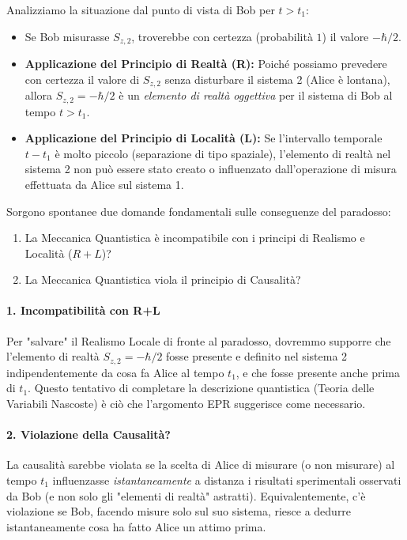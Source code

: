 Analizziamo la situazione dal punto di vista di Bob per $t > t_1$:
\begin{itemize}
    \item Se Bob misurasse $S_{z,2}$, troverebbe con certezza (probabilità $1$) il valore $-\hbar/2$.
    \item \textbf{Applicazione del Principio di Realtà (R):} Poiché possiamo prevedere con certezza il valore di $S_{z,2}$ senza disturbare il sistema 2 (Alice è lontana), allora $S_{z,2} = -\hbar/2$ è un \textit{elemento di realtà oggettiva} per il sistema di Bob al tempo $t > t_1$.
    \item \textbf{Applicazione del Principio di Località (L):} Se l'intervallo temporale $t - t_1$ è molto piccolo (separazione di tipo spaziale), l'elemento di realtà nel sistema 2 non può essere stato creato o influenzato dall'operazione di misura effettuata da Alice sul sistema 1.
\end{itemize}

Sorgono spontanee due domande fondamentali sulle conseguenze del paradosso:
\begin{enumerate}
    \item La Meccanica Quantistica è incompatibile con i principi di Realismo e Località ($R+L$)?
    \item La Meccanica Quantistica viola il principio di Causalità?
\end{enumerate}

\paragraph{1. Incompatibilità con R+L}
Per "salvare" il Realismo Locale di fronte al paradosso, dovremmo supporre che l'elemento di realtà $S_{z,2} = -\hbar/2$ fosse presente e definito nel sistema 2 indipendentemente da cosa fa Alice al tempo $t_1$, e che fosse presente anche prima di $t_1$.
Questo tentativo di completare la descrizione quantistica (Teoria delle Variabili Nascoste) è ciò che l'argomento EPR suggerisce come necessario.

\paragraph{2. Violazione della Causalità?}
La causalità sarebbe violata se la scelta di Alice di misurare (o non misurare) al tempo $t_1$ influenzasse \textit{istantaneamente} a distanza i risultati sperimentali osservati da Bob (e non solo gli "elementi di realtà" astratti).
Equivalentemente, c'è violazione se Bob, facendo misure solo sul suo sistema, riesce a dedurre istantaneamente cosa ha fatto Alice un attimo prima.

